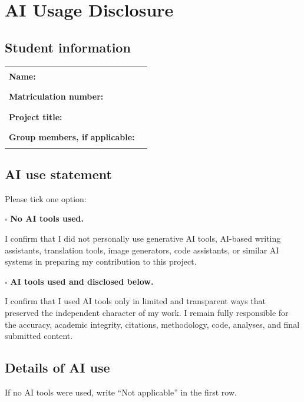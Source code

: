 \documentclass[11pt]{article}
\begin{document}
\newpage
\section*{AI Usage Disclosure}

\subsection*{Student information}

\begin{tabularx}{\textwidth}{>{\bfseries}l X}
Name: & \rule{10cm}{0.4pt} \\[0.6em]
Matriculation number: & \rule{10cm}{0.4pt} \\[0.6em]
Project title: & \rule{10cm}{0.4pt} \\[0.6em]
Group members, if applicable: & \rule{10cm}{0.4pt} \\
\end{tabularx}

\bigskip

\subsection*{AI use statement}

Please tick one option:

\medskip

\noindent
$\square$ \textbf{No AI tools used.}

\noindent
I confirm that I did not personally use generative AI tools, AI-based writing
assistants, translation tools, image generators, code assistants, or similar AI
systems in preparing my contribution to this project.

\medskip

\noindent
$\square$ \textbf{AI tools used and disclosed below.}

\noindent
I confirm that I used AI tools only in limited and transparent ways that preserved
the independent character of my work. I remain fully responsible for the accuracy,
academic integrity, citations, methodology, code, analyses, and final submitted
content.

\bigskip

\subsection*{Details of AI use}

If no AI tools were used, write ``Not applicable'' in the first row.
\end{document}
